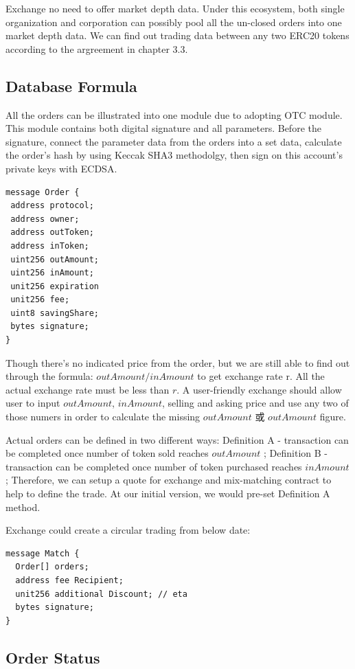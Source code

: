 \documentclass[UTF8,nofonts]{article}
\begin{document}
Exchange no need to offer market depth data. Under this ecosystem,  both single organization and corporation can possibly pool all the un-closed orders into one market depth data. We can find out trading data between any two ERC20 tokens according to the argreement in chapter 3.3.

\subsection{Database Formula\label{sec: dataformat}}

All the orders can be illustrated into one module due to adopting OTC module. This module contains both digital signature and all parameters. Before the signature,  connect the parameter data from the orders into a set data,  calculate the order’s hash by using Keccak SHA3 methodolgy,  then sign on this account’s private keys with ECDSA.


\begin{verbatim}
message Order {
 address protocol;
 address owner;
 address outToken;
 address inToken;
 uint256 outAmount;
 uint256 inAmount;
 unit256 expiration
 unit256 fee;
 uint8 savingShare;
 bytes signature;
}
\end{verbatim}

Though there’s no indicated price from the order,  but we are still able to find out through the formula: $outAmount / inAmount$ to get exchange rate r. All the actual exchange rate must be less than $r$. A user-friendly exchange should allow user to input $outAmount$, $inAmount$,  selling and asking price and use any two of those numers in order to calculate the missing $outAmount$ 或 $outAmount$ figure.

Actual orders can be defined in two different ways: Definition A - transaction can be completed once number of token sold reaches $outAmount$ ; Definition B - transaction can be completed once number of token purchased reaches $inAmount$; Therefore,  we can setup a quote for exchange and mix-matching contract to help to define the trade. At our initial version,  we would pre-set Definition A method.

Exchange could create a circular trading from below date:
\begin{verbatim}
message Match {
  Order[] orders;
  address fee Recipient;
  unit256 additional Discount; // eta
  bytes signature;
}
\end{verbatim}


\subsection{Order Status\label{sec: orderstate}}
\end{document}
